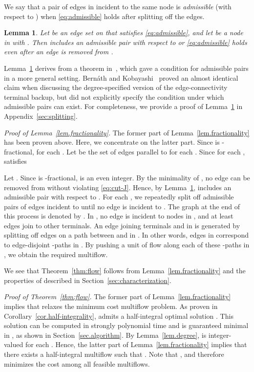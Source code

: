 \documentclass{article}
\newtheorem{lemma}{Lemma}
\begin{document}
We say that a pair of edges in  incident to the same node is \emph{admissible} (with respect
to )
when \eqref{eq:admissible} holds
after splitting off the edges.

\begin{lemma}\label{lem.admissible-splitting}
Let  be an edge set on  that satisfies \eqref{eq:admissible},
and let  be a node in  with .
Then  includes 
an admissible pair with respect to  or 
\eqref{eq:admissible} holds even after an edge is removed from .
\end{lemma}

Lemma~\ref{lem.admissible-splitting} derives from a theorem in~\cite{Nutov2009,Bernath2012},
which gave a condition for admissible pairs in a more general setting.
Bern{\'a}th and Kobayashi~\cite{Bernath2014} 
proved an almost identical claim when discussing the degree-specified version
of the edge-connectivity terminal backup, but did not explicitly specify 
the condition under which admissible pairs can exist.
For completeness, we provide a proof of
Lemma~\ref{lem.admissible-splitting} in Appendix~\ref{sec:splitting}.


{\em Proof of Lemma~\ref{lem.fractionality}.}
The former part of Lemma~\ref{lem.fractionality} has been proven above.
Here, we concentrate on the latter part.
Since  is -fractional,  for each .
Let  be the set of  edges parallel to  for each .
Since  for each ,
 satisfies 

Let . Since  is -fractional,  is an even integer. 
By the minimality of ,
no edge can be removed from  without violating
\eqref{eq:cut-J}.
Hence, by Lemma~\ref{lem.admissible-splitting},  includes an admissible pair
with respect to .
For each ,
we repeatedly split off admissible pairs of edges incident to 
until no edge is incident to .
The graph at the end of this process is denoted by .
In , no edge is incident to nodes in , and 
at least  edges join  to other terminals.
An edge joining terminals  and  in  is generated by
splitting off edges on a path between  and  in .
In other words, edges in  correspond to edge-disjoint -paths in .
By pushing a  unit of flow along each of these -paths in ,
we obtain the required multiflow.
\qquad\endproof

We see that Theorem~\ref{thm:flow} follows from
Lemma~\ref{lem.fractionality} and the properties of  
described in Section~\ref{sec:characterization}.

{\em Proof of Theorem~\ref{thm:flow}.}
The former part of Lemma~\ref{lem.fractionality} 
implies that  relaxes the minimum cost multiflow problem.
As proven in Corollary~\ref{cor.half-integrality},
 admits a half-integral optimal solution . 
This solution can be computed in strongly polynomial time
and is guaranteed minimal in , as shown in Section~\ref{sec.algorithm}.
By Lemma~\ref{lem.degree},  is integer-valued for each .
Hence, the latter part of Lemma~\ref{lem.fractionality} implies that 
there exists a half-integral multiflow 
such that .
Note that , and therefore  minimizes
the cost among all feasible multiflows.
\end{document}
